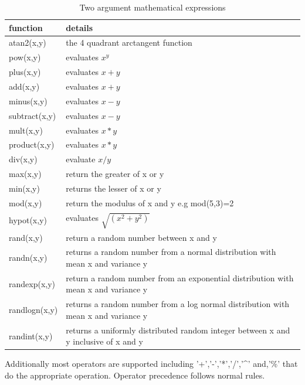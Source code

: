 \documentclass[12pt]{article} %
\begin{document}
\begin{table}[ht]
	
	\caption{Two argument mathematical expressions} %
	\centering %
	\begin{tabular}{l p{11cm}} %
		\hline %
		function & details \\ [0.5ex] %
		\hline %
		atan2(x,y) & the 4 quadrant arctangent function \\
		pow(x,y) & evaluates $x^y$ \\
		plus(x,y) & evaluates $ x+y$ \\
		add(x,y) & evaluates $x+y$ \\
		minus(x,y) & evaluates $ x - y$ \\
		subtract(x,y) & evaluates $ x - y$ \\
		mult(x,y) & evaluates $x*y$ \\
		product(x,y) & evaluates $x*y$\\
		div(x,y) & evaluate $x/y$ \\
		max(x,y) & return the greater of x or y \\
		min(x,y) & returns the lesser of x or y \\
		mod(x,y)  & return the modulus of x and y e.g mod(5,3)=2\\
		hypot(x,y) & evaluates $\sqrt{(x^2+y^2)}$ \\
		rand(x,y) & return a random number between x and y \\
		randn(x,y) & returns a random number from a normal distribution with mean x and variance y\\
		randexp(x,y) & return a random number from an exponential distribution with mean x and variance y \\
		randlogn(x,y) & returns a random number from a log normal distribution with mean x and variance y \\
		randint(x,y) & returns a uniformly distributed random integer between x and y inclusive of x and y \\		
		\hline %
	\end{tabular}
	\label{table:func2}
\end{table} 
Additionally most operators are supported including '+','-','*','/','\textasciicircum' and,'\%' that do the appropriate operation.  Operator precedence follows normal rules. 
\end{document}
